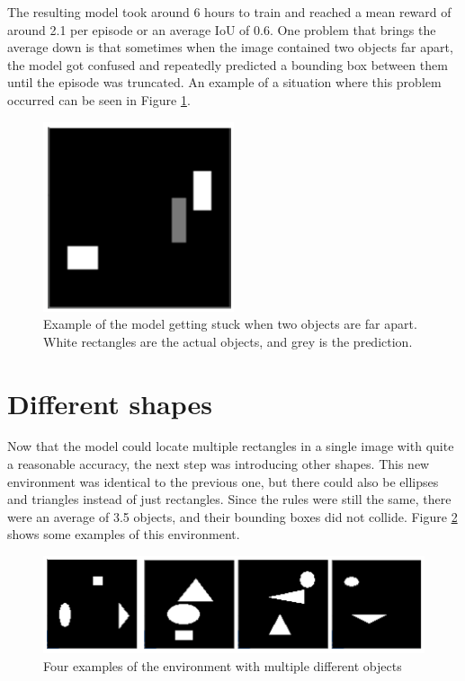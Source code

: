 \documentclass[
  digital,     %
  oneside,     %
  nosansbold,  %
  nocolorbold, %
  lof,         %
  lot,         %
]{fithesis4}
\begin{document}
The resulting model took around 6 hours to train and reached a mean reward of around 2.1 per episode or an average IoU of 0.6. One problem that brings the average down is that sometimes when the image contained two objects far apart, the model got confused and repeatedly predicted a bounding box between them until the episode was truncated. An example of a situation where this problem occurred can be seen in Figure \ref{fig:v3_stuck}.

\begin{figure}
    \centering
    \includegraphics[width=0.5\linewidth]{results/v3_stuck.png}
    \caption{Example of the model getting stuck when two objects are far apart. White rectangles are the actual objects, and grey is the prediction.}
    \label{fig:v3_stuck}
\end{figure}

\section{Different shapes}
Now that the model could locate multiple rectangles in a single image with quite a reasonable accuracy, the next step was introducing other shapes. This new environment was identical to the previous one, but there could also be ellipses and triangles instead of just rectangles. Since the rules were still the same, there were an average of 3.5 objects, and their bounding boxes did not collide. Figure \ref{fig:env4} shows some examples of this environment.

\begin{figure}
    \includegraphics[width=1\linewidth]{env_examples/env4.png}
    \caption{Four examples of the environment with multiple different objects}
    \label{fig:env4}
\end{figure}
 
\end{document}
